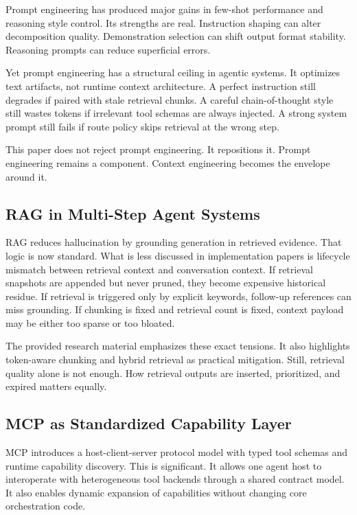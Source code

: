 \documentclass[conference]{IEEEtran}
\begin{document}
Prompt engineering has produced major gains in few-shot performance and reasoning style control.
Its strengths are real.
Instruction shaping can alter decomposition quality.
Demonstration selection can shift output format stability.
Reasoning prompts can reduce superficial errors.

Yet prompt engineering has a structural ceiling in agentic systems.
It optimizes text artifacts, not runtime context architecture.
A perfect instruction still degrades if paired with stale retrieval chunks.
A careful chain-of-thought style still wastes tokens if irrelevant tool schemas are always injected.
A strong system prompt still fails if route policy skips retrieval at the wrong step.

This paper does not reject prompt engineering.
It repositions it.
Prompt engineering remains a component.
Context engineering becomes the envelope around it.

\subsection{RAG in Multi-Step Agent Systems}

RAG reduces hallucination by grounding generation in retrieved evidence.
That logic is now standard.
What is less discussed in implementation papers is lifecycle mismatch between retrieval context and conversation context.
If retrieval snapshots are appended but never pruned, they become expensive historical residue.
If retrieval is triggered only by explicit keywords, follow-up references can miss grounding.
If chunking is fixed and retrieval count is fixed, context payload may be either too sparse or too bloated.

The provided research material emphasizes these exact tensions.
It also highlights token-aware chunking and hybrid retrieval as practical mitigation.
Still, retrieval quality alone is not enough.
How retrieval outputs are inserted, prioritized, and expired matters equally.

\subsection{MCP as Standardized Capability Layer}

MCP introduces a host-client-server protocol model with typed tool schemas and runtime capability discovery.
This is significant.
It allows one agent host to interoperate with heterogeneous tool backends through a shared contract model.
It also enables dynamic expansion of capabilities without changing core orchestration code.
\end{document}
